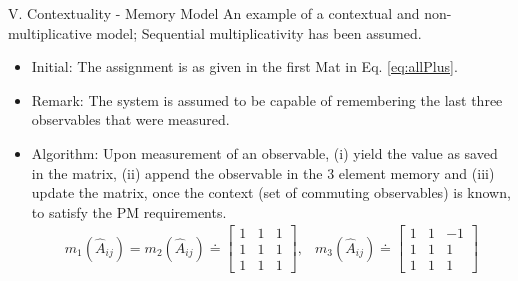 \documentclass[final,hyperref={pdfpagelabels=false}]{beamer}
\begin{document}
\begin{frame}[t]
\begin{columns}[c]
\begin{column}{.69\textwidth}
\begin{columns}[b]
\begin{column}{.48\textwidth}

          \begin{block}{V. Contextuality - Memory Model}
              An example of a contextual and non-multiplicative model; Sequential multiplicativity has been assumed.

            \begin{itemize}
              \item Initial: The assignment is as given in the first Mat in Eq. \ref{eq:allPlus}. 

              \item Remark: The system is assumed to be capable of remembering the last three observables that were measured. 

              \item Algorithm: Upon measurement of an observable, (i) yield the value as saved in the matrix, (ii) append the observable in the 3 element memory and (iii) update the matrix, once the context (set of commuting observables) is known, to satisfy the PM requirements.
                \begin{align}  \label{eq:allPlus} 
                  m_1(\hat A_{ij})=m_2 (\hat A_{ij})\doteq
                  \left[
                  \begin{array}{ccc}
                    1 & 1 & 1 \\
                    1 & 1 & 1 \\
                    1 & 1 & 1
                  \end{array} \right],
                            &
                              m_3 (\hat A_{ij}) \doteq
                              \left[
                              \begin{array}{ccc}
                                1 & 1 & -1 \\
                                1 & 1 & 1 \\
                                1 & 1 & 1
                              \end{array}\right] %
                \end{align}


\end{itemize}
\end{block}
\end{column}
\end{columns}
\end{column}
\end{columns}
\end{frame}
\end{document}

